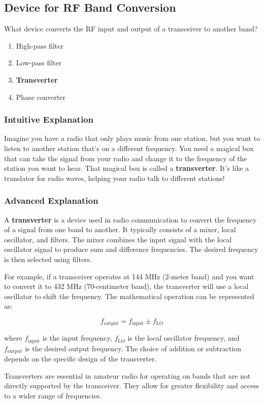 \subsection{Device for RF Band Conversion}
\label{T7A06}

\begin{tcolorbox}[colback=gray!10!white,colframe=black!75!black,title=T7A06]
What device converts the RF input and output of a transceiver to another band?
\begin{enumerate}[label=\Alph*)]
    \item High-pass filter
    \item Low-pass filter
    \item \textbf{Transverter}
    \item Phase converter
\end{enumerate}
\end{tcolorbox}

\subsubsection{Intuitive Explanation}
Imagine you have a radio that only plays music from one station, but you want to listen to another station that’s on a different frequency. You need a magical box that can take the signal from your radio and change it to the frequency of the station you want to hear. That magical box is called a \textbf{transverter}. It’s like a translator for radio waves, helping your radio talk to different stations!

\subsubsection{Advanced Explanation}
A \textbf{transverter} is a device used in radio communication to convert the frequency of a signal from one band to another. It typically consists of a mixer, local oscillator, and filters. The mixer combines the input signal with the local oscillator signal to produce sum and difference frequencies. The desired frequency is then selected using filters.

For example, if a transceiver operates at 144 MHz (2-meter band) and you want to convert it to 432 MHz (70-centimeter band), the transverter will use a local oscillator to shift the frequency. The mathematical operation can be represented as:

\[
f_{\text{output}} = f_{\text{input}} \pm f_{\text{LO}}
\]

where \( f_{\text{input}} \) is the input frequency, \( f_{\text{LO}} \) is the local oscillator frequency, and \( f_{\text{output}} \) is the desired output frequency. The choice of addition or subtraction depends on the specific design of the transverter.

Transverters are essential in amateur radio for operating on bands that are not directly supported by the transceiver. They allow for greater flexibility and access to a wider range of frequencies.

